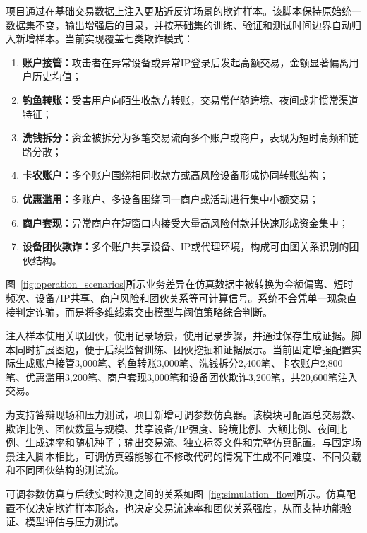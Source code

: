 项目通过在基础交易数据上注入更贴近反诈场景的欺诈样本。该脚本保持原始统一数据集不变，输出增强后的目录，并按基础集的训练、验证和测试时间边界自动归入新增样本。当前实现覆盖七类欺诈模式：

\begin{enumerate}
  \item \textbf{账户接管：}攻击者在异常设备或异常IP登录后发起高额交易，金额显著偏离用户历史均值；
  \item \textbf{钓鱼转账：}受害用户向陌生收款方转账，交易常伴随跨境、夜间或非惯常渠道特征；
  \item \textbf{洗钱拆分：}资金被拆分为多笔交易流向多个账户或商户，表现为短时高频和链路分散；
  \item \textbf{卡农账户：}多个账户围绕相同收款方或高风险设备形成协同转账结构；
  \item \textbf{优惠滥用：}多账户、多设备围绕同一商户或活动进行集中小额交易；
  \item \textbf{商户套现：}异常商户在短窗口内接受大量高风险付款并快速形成资金集中；
  \item \textbf{设备团伙欺诈：}多个账户共享设备、IP或代理环境，构成可由图关系识别的团伙结构。
\end{enumerate}

图~\ref{fig:operation_scenarios}所示业务差异在仿真数据中被转换为金额偏离、短时频次、设备/IP共享、商户风险和团伙关系等可计算信号。系统不会凭单一现象直接判定诈骗，而是将多维线索交由模型与阈值策略综合判断。

注入样本使用关联团伙，使用记录场景，使用记录步骤，并通过保存生成证据。脚本同时扩展图边，便于后续监督训练、团伙挖掘和证据展示。当前固定增强配置实际生成账户接管3,000笔、钓鱼转账3,000笔、洗钱拆分2,400笔、卡农账户2,800笔、优惠滥用3,200笔、商户套现3,000笔和设备团伙欺诈3,200笔，共20,600笔注入交易。

为支持答辩现场和压力测试，项目新增可调参数仿真器。该模块可配置总交易数、欺诈比例、团伙数量与规模、共享设备/IP强度、跨境比例、大额比例、夜间比例、生成速率和随机种子；输出交易流、独立标签文件和完整仿真配置。与固定场景注入脚本相比，可调仿真器能够在不修改代码的情况下生成不同难度、不同负载和不同团伙结构的测试流。

可调参数仿真与后续实时检测之间的关系如图~\ref{fig:simulation_flow}所示。仿真配置不仅决定欺诈样本形态，也决定交易流速率和团伙关系强度，从而支持功能验证、模型评估与压力测试。

